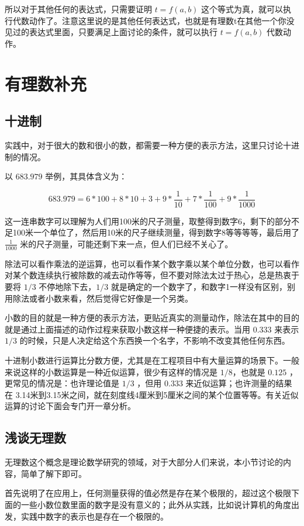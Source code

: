 \documentclass[12pt,oneside]{book}
\begin{document}
所以对于其他任何的表达式，只需要证明 $t=f(a,b)$ 这个等式为真，就可以执行代数动作了。注意这里说的是其他任何表达式，也就是有理数t在其他一个你没见过的表达式里面，只要满足上面讨论的条件，就可以执行 $t=f(a,b)$ 代数动作。



\chapter{有理数补充}
\section{十进制}
实践中，对于很大的数和很小的数，都需要一种方便的表示方法，这里只讨论十进制的情况。

以 $683.979$ 举例，其具体含义为：

\[
683.979 = 6*100 + 8 * 10 + 3 + 9*\frac{1}{10} + 7 * \frac{1}{100} + 9 * \frac{1}{1000}
\]

这一连串数字可以理解为人们用100米的尺子测量，取整得到数字6，剩下的部分不足100米一个单位了，然后用10米的尺子继续测量，得到数字8等等等等，最后用了 $\frac{1}{1000}$ 米的尺子测量，可能还剩下来一点，但人们已经不关心了。

除法可以看作乘法的逆运算，也可以看作某个数字乘以某个单位分数，也可以看作对某个数连续执行被除数的减去动作等等，但不要对除法太过于热心，总是热衷于要将 $1/3$ 不停地除下去，$1/3$ 就是确定的一个数字了，和数字1一样没有区别，别用除法或者小数来看，然后觉得它好像是一个另类。

小数的目的就是一种方便的表示方法，更贴近真实的测量动作，除法在其中的目的就是通过上面描述的动作过程来获取小数这样一种便捷的表示。当用 $0.333$ 来表示 $1/3$ 的时候，只是人决定给这个东西换一个名字，不影响不改变其他任何东西。

十进制小数进行运算比分数方便，尤其是在工程项目中有大量运算的场景下。一般来说这样的小数运算是一种近似运算，很少有这样的情况是 $1/8$，也就是 $0.125$ ，更常见的情况是：也许理论值是 $1/3$ ，但用 $0.333$ 来近似运算；也许测量的结果在 3.14米到3.15米之间，就在刻度线4厘米到5厘米之间的某个位置等等。有关近似运算的讨论下面会专门开一章分析。


\section{浅谈无理数}
无理数这个概念是理论数学研究的领域，对于大部分人们来说，本小节讨论的内容，简单了解下即可。

\cite{高观点下的初等数学第一卷}首先说明了在应用上，任何测量获得的值必然是存在某个极限的，超过这个极限下面的一些小数位数里面的数字是没有意义的；此外从实践，比如说计算机的角度出发，实践中数字的表示也是存在一个极限的。
\end{document}
